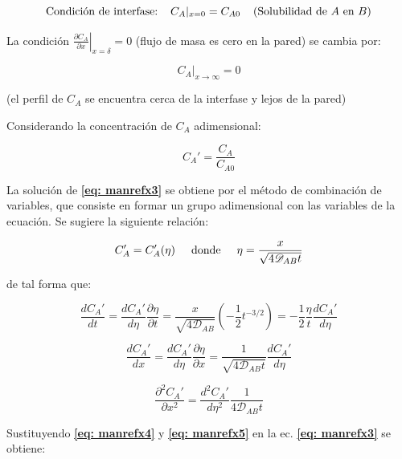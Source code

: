 \begin{equation}
	 \text{Condición de interfase:} \hspace{0.4cm} C_A|_{x=0} = C_{A0} \hspace{0.4cm} \text{(Solubilidad de $A$ en $B$)}
\end{equation}

La condición $\left. \frac{\partial C_A}{\partial x} \right|_{x = \delta} = 0$ (flujo de masa es cero en la pared) se cambia por:

\begin{equation}
	C_A|_{x \to \infty} = 0
\end{equation}

(el perfil de $C_A$ se encuentra cerca de la interfase y lejos de la pared)

Considerando la concentración de $C_A$ adimensional:

\begin{equation}
	C_A' = \frac{C_A}{C_{A0}}
\end{equation}

La solución de \textbf{\eqref{eq: manrefx3}} se obtiene por el método de combinación de variables, que consiste en formar un grupo adimensional con las variables de la ecuación. Se sugiere la siguiente relación:

\begin{equation}
	C_A' = C_A'(\eta) \hspace{0.5cm} \text{donde} \hspace{0.5cm} \eta = \frac{x}{\sqrt{4 \mathscr{D}_{AB} t}}
\end{equation}

de tal forma que:

\begin{equation} \label{eq: manrefx4}
	\frac{d C_A'}{dt} = \frac{d C_A'}{d \eta} \frac{\partial \eta}{\partial t} = \frac{x}{\sqrt{4 \mathscr{D}_{AB}}} \left( - \frac{1}{2} t^{-3/2}  \right) = - \frac{1}{2} \frac{\eta}{t} \frac{d C_A'}{d \eta}
\end{equation}

$$\frac{dC_A'}{dx} = \frac{dC_A'}{d \eta} \frac{\partial \eta}{\partial x} = \frac{1}{\sqrt{4 \mathscr{D}_{AB} t}} \frac{dC_A'}{d \eta}$$

\begin{equation} \label{eq: manrefx5}
	\frac{\partial^2 C_A'}{\partial x^2} =  \frac{d^2 C_A'}{d \eta^2} \frac{1}{4 \mathscr{D}_{AB}t}
\end{equation}

Sustituyendo \textbf{\eqref{eq: manrefx4}} y \textbf{\eqref{eq: manrefx5}} en la ec. \textbf{\eqref{eq: manrefx3}} se obtiene: 

